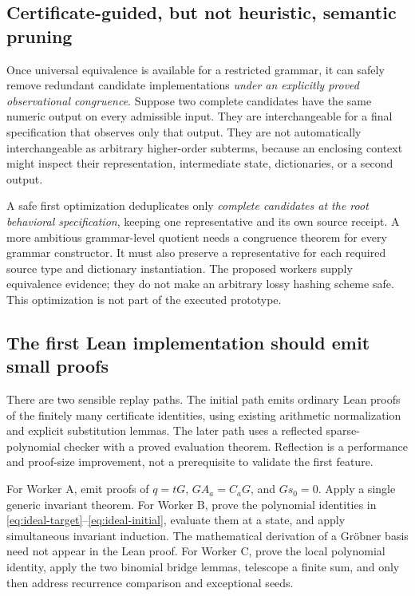 \subsection{Certificate-guided, but not heuristic, semantic pruning}

Once universal equivalence is available for a restricted grammar, it can safely
remove redundant candidate implementations \emph{under an explicitly proved
observational congruence}. Suppose two complete candidates have the same numeric
output on every admissible input. They are interchangeable for a final
specification that observes only that output. They are not automatically
interchangeable as arbitrary higher-order subterms, because an enclosing context
might inspect their representation, intermediate state, dictionaries, or a
second output.

A safe first optimization deduplicates only \emph{complete candidates at the
root behavioral specification}, keeping one representative and its own source
receipt. A more ambitious grammar-level quotient needs a congruence theorem
for every grammar constructor. It must also preserve a representative for each
required source type and dictionary instantiation. The proposed workers supply
equivalence evidence; they do not make an arbitrary lossy hashing scheme safe.
This optimization is not part of the executed prototype.

\subsection{The first Lean implementation should emit small proofs}

There are two sensible replay paths. The initial path emits ordinary Lean
proofs of the finitely many certificate identities, using existing arithmetic
normalization and explicit substitution lemmas. The later path uses a reflected
sparse-polynomial checker with a proved evaluation theorem. Reflection is a
performance and proof-size improvement, not a prerequisite to validate the
first feature.

For Worker A, emit proofs of $q=tG$, $GA_a=C_aG$, and $Gs_0=0$. Apply a single
generic invariant theorem. For Worker B, prove the polynomial identities in
\eqref{eq:ideal-target}--\eqref{eq:ideal-initial}, evaluate them at a state,
and apply simultaneous invariant induction. The mathematical derivation of a
Gr\"obner basis need not appear in the Lean proof. For Worker C, prove the
local polynomial identity, apply the two binomial bridge lemmas, telescope a
finite sum, and only then address recurrence comparison and exceptional seeds.

